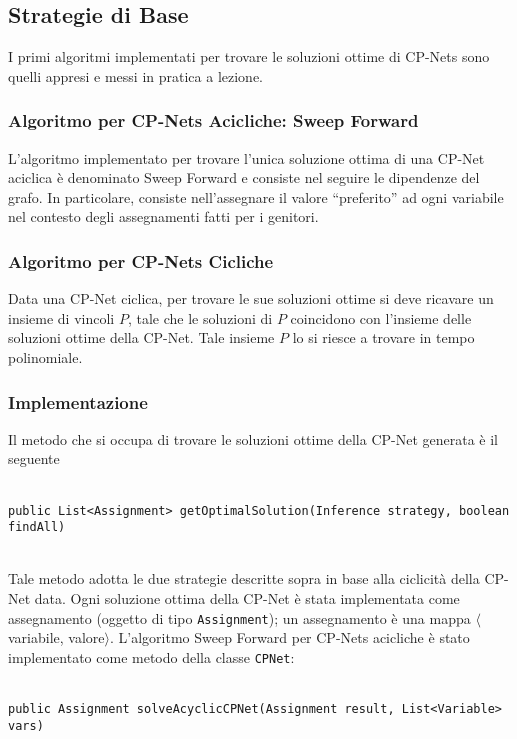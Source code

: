 \subsection{Strategie di Base}
I primi algoritmi implementati per trovare le soluzioni ottime di CP-Nets sono quelli appresi e messi in pratica a lezione.

\subsubsection{Algoritmo per CP-Nets Acicliche: Sweep Forward}
L'algoritmo implementato per trovare l'unica soluzione ottima di una CP-Net aciclica è denominato Sweep Forward e consiste nel seguire le dipendenze del grafo. In particolare, consiste nell'assegnare il valore ``preferito'' ad ogni variabile nel contesto degli assegnamenti fatti per i genitori.

\subsubsection{Algoritmo per CP-Nets Cicliche}
Data una CP-Net ciclica, per trovare le sue soluzioni ottime si deve ricavare un insieme di vincoli $P$, tale che le soluzioni di $P$ coincidono con l'insieme delle soluzioni ottime della CP-Net. Tale insieme $P$ lo si riesce a  trovare in tempo polinomiale.

\subsubsection{Implementazione}
Il metodo che si occupa di trovare le soluzioni ottime della CP-Net generata è il seguente
\\
\\
\centerline{\texttt{public List<Assignment> getOptimalSolution(Inference strategy, boolean findAll)}}
\\

Tale metodo adotta le due strategie descritte sopra in base alla ciclicità della CP-Net data.
Ogni soluzione ottima della CP-Net è stata implementata come assegnamento (oggetto di tipo \texttt{Assignment}); un assegnamento è una mappa $\langle$variabile, valore$\rangle$.
L'algoritmo Sweep Forward per CP-Nets acicliche è stato implementato come metodo della classe \texttt{CPNet}:\\
\\
\centerline{\texttt{public Assignment solveAcyclicCPNet(Assignment result, List<Variable> vars)}}
\\

